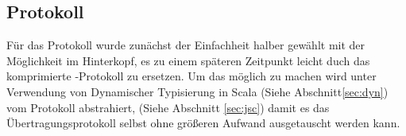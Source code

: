\subsection{Protokoll}

Für das Protokoll wurde zunächst der Einfachheit halber  gewählt mit der Möglichkeit im
Hinterkopf, es zu einem späteren Zeitpunkt leicht duch das komprimierte -Protokoll zu
ersetzen. Um das möglich zu machen wird unter Verwendung von Dynamischer Typisierung in Scala (Siehe
Abschnitt\ref{sec:dyn}) vom Protokoll abstrahiert, (Siehe Abschnitt \ref{sec:jsc}) damit es das
Übertragungsprotokoll selbst ohne größeren Aufwand ausgetauscht werden kann.

\clearpage